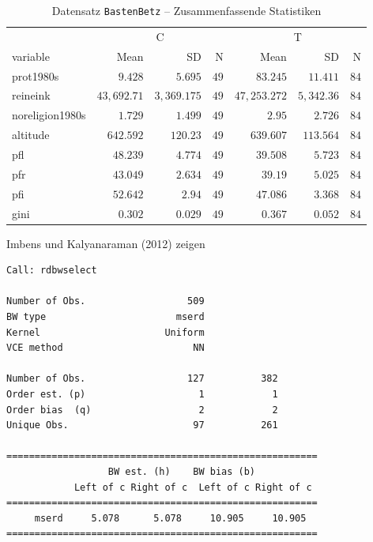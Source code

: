 \documentclass[
  letterpaper,
  DIV=11,
  oneside]{scrreprt}
\newenvironment{Shaded}{\begin{snugshade}}{\end{snugshade}}
\newcommand{\AttributeTok}[1]{\textcolor[rgb]{0.40,0.45,0.13}{#1}}
\newcommand{\FunctionTok}[1]{\textcolor[rgb]{0.28,0.35,0.67}{#1}}
\newcommand{\NormalTok}[1]{\textcolor[rgb]{0.00,0.23,0.31}{#1}}
\newcommand{\OtherTok}[1]{\textcolor[rgb]{0.00,0.23,0.31}{#1}}
\newcommand{\SpecialCharTok}[1]{\textcolor[rgb]{0.37,0.37,0.37}{#1}}
\newcommand{\StringTok}[1]{\textcolor[rgb]{0.13,0.47,0.30}{#1}}
\begin{document}
\hypertarget{tbl-sumstat}{}
\begin{longtable}{lrrrrrr}
\caption{\label{tbl-sumstat}Datensatz \texttt{BastenBetz} -- Zusammenfassende Statistiken }\tabularnewline

\toprule
 & \multicolumn{3}{c}{C} & \multicolumn{3}{c}{T} \\ 
\cmidrule(lr){2-4} \cmidrule(lr){5-7}
variable & Mean & SD & N & Mean & SD & N \\ 
\midrule
prot1980s & $9.428$ & $5.695$ & $49$ & $83.245$ & $11.411$ & $84$ \\ 
reineink & $43,692.71$ & $3,369.175$ & $49$ & $47,253.272$ & $5,342.36$ & $84$ \\ 
noreligion1980s & $1.729$ & $1.499$ & $49$ & $2.95$ & $2.726$ & $84$ \\ 
altitude & $642.592$ & $120.23$ & $49$ & $639.607$ & $113.564$ & $84$ \\ 
pfl & $48.239$ & $4.774$ & $49$ & $39.508$ & $5.723$ & $84$ \\ 
pfr & $43.049$ & $2.634$ & $49$ & $39.19$ & $5.025$ & $84$ \\ 
pfi & $52.642$ & $2.94$ & $49$ & $47.086$ & $3.368$ & $84$ \\ 
gini & $0.302$ & $0.029$ & $49$ & $0.367$ & $0.052$ & $84$ \\ 
\bottomrule
\end{longtable}

Imbens und Kalyanaraman (2012) zeigen

\begin{Shaded}
\end{Shaded}

\begin{verbatim}
Call: rdbwselect

Number of Obs.                  509
BW type                       mserd
Kernel                      Uniform
VCE method                       NN

Number of Obs.                  127          382
Order est. (p)                    1            1
Order bias  (q)                   2            2
Unique Obs.                      97          261

=======================================================
                  BW est. (h)    BW bias (b)
            Left of c Right of c  Left of c Right of c
=======================================================
     mserd     5.078      5.078     10.905     10.905
=======================================================
\end{verbatim}
\end{document}
